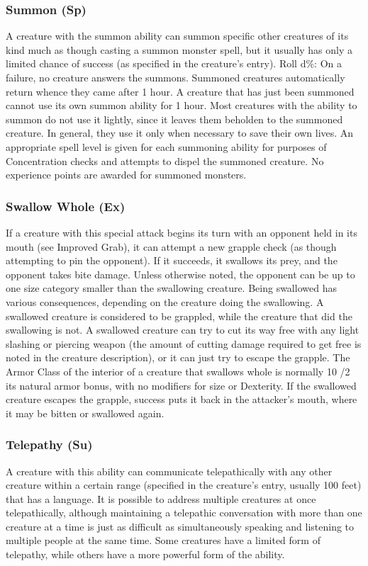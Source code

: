 \subsubsection{Summon (Sp)} A creature with the summon ability can summon specific other creatures of its kind much as though casting a summon monster spell, but it usually has only a limited chance of success (as specified in the creature's entry). Roll d\%: On a failure, no creature answers the summons. Summoned creatures automatically return whence they came after 1 hour. A creature that has just been summoned cannot use its own summon ability for 1 hour. Most creatures with the ability to summon do not use it lightly, since it leaves them beholden to the summoned creature. In general, they use it only when necessary to save their own lives. An appropriate spell level is given for each summoning ability for purposes of Concentration checks and attempts to dispel the summoned creature. No experience points are awarded for summoned monsters.

\subsubsection{Swallow Whole (Ex)} If a creature with this special attack begins its turn with an opponent held in its mouth (see Improved Grab), it can attempt a new grapple check (as though attempting to pin the opponent). If it succeeds, it swallows its prey, and the opponent takes bite damage. Unless otherwise noted, the opponent can be up to one size category smaller than the swallowing creature. Being swallowed has various consequences, depending on the creature doing the swallowing. A swallowed creature is considered to be grappled, while the creature that did the swallowing is not. A swallowed creature can try to cut its way free with any light slashing or piercing weapon (the amount of cutting damage required to get free is noted in the creature description), or it can just try to escape the grapple. The Armor Class of the interior of a creature that swallows whole is normally 10 /2 its natural armor bonus, with no modifiers for size or Dexterity. If the swallowed creature escapes the grapple, success puts it back in the attacker's mouth, where it may be bitten or swallowed again.

\subsubsection{Telepathy (Su)} A creature with this ability can communicate telepathically with any other creature within a certain range (specified in the creature's entry, usually 100 feet) that has a language. It is possible to address multiple creatures at once telepathically, although maintaining a telepathic conversation with more than one creature at a time is just as difficult as simultaneously speaking and listening to multiple people at the same time.
Some creatures have a limited form of telepathy, while others have a more powerful form of the ability.

